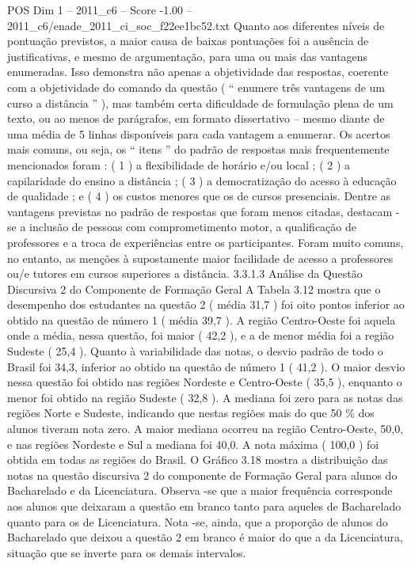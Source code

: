 \begin{textsample}{POS Dim 1 – 2011\_c6 – Score -1.00 – 2011\_c6/enade\_2011\_ci\_soc\_f22ee1bc52.txt}
Quanto aos diferentes níveis de pontuação previstos, a maior causa de baixas pontuações foi a ausência de justificativas, e mesmo de argumentação, para uma ou mais das vantagens enumeradas.
Isso demonstra não apenas a objetividade das respostas, coerente com a objetividade do comando da questão ( “ enumere três vantagens de um curso a distância ” ), mas também certa dificuldade de formulação plena de um texto, ou ao menos de parágrafos, em formato dissertativo – mesmo diante de uma média de 5 linhas disponíveis para cada vantagem a enumerar.
Os acertos mais comuns, ou seja, os “ itens ” do padrão de respostas mais frequentemente mencionados foram : ( 1 ) a flexibilidade de horário e/ou local ; ( 2 ) a capilaridade do ensino a distância ; ( 3 ) a democratização do acesso à educação de qualidade ; e ( 4 ) os custos menores que os de cursos presenciais.
Dentre as vantagens previstas no padrão de respostas que foram menos citadas, destacam -se a inclusão de pessoas com comprometimento motor, a qualificação de professores e a troca de experiências entre os participantes.
Foram muito comuns, no entanto, as menções à supostamente maior facilidade de acesso a professores ou/e tutores em cursos superiores a distância. 3.3.1.3 Análise da Questão Discursiva 2 do Componente de Formação Geral A Tabela 3.12 mostra que o desempenho dos estudantes na questão 2 ( média 31,7 ) foi oito pontos inferior ao obtido na questão de número 1 ( média 39,7 ).
A região Centro-Oeste foi aquela onde a média, nessa questão, foi maior ( 42,2 ), e a de menor média foi a região Sudeste ( 25,4 ).
Quanto à variabilidade das notas, o desvio padrão de todo o Brasil foi 34,3, inferior ao obtido na questão de número 1 ( 41,2 ).
O maior desvio nessa questão foi obtido nas regiões Nordeste e Centro-Oeste ( 35,5 ), enquanto o menor foi obtido na região Sudeste ( 32,8 ).
A mediana foi zero para as notas das regiões Norte e Sudeste, indicando que nestas regiões mais do que 50 \% dos alunos tiveram nota zero.
A maior mediana ocorreu na região Centro-Oeste, 50,0, e nas regiões Nordeste e Sul a mediana foi 40,0.
A nota máxima ( 100,0 ) foi obtida em todas as regiões do Brasil.
O Gráfico 3.18 mostra a distribuição das notas na questão discursiva 2 do componente de Formação Geral para alunos do Bacharelado e da Licenciatura.
Observa -se que a maior frequência corresponde aos alunos que deixaram a questão em branco tanto para aqueles de Bacharelado quanto para os de Licenciatura.
Nota -se, ainda, que a proporção de alunos do Bacharelado que deixou a questão 2 em branco é maior do que a da Licenciatura, situação que se inverte para os demais intervalos.

\end{textsample}
